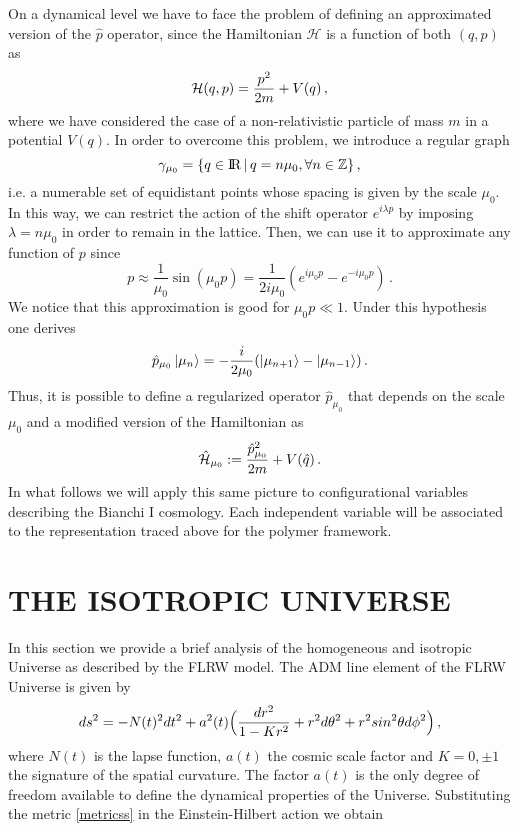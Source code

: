 \documentclass[aps,prd,twocolumn,nofootinbib,superscriptaddress]{revtex4-2}
\begin{document}
On a dynamical level we have to face the problem of defining an approximated version of the $\hat p$ operator, since the Hamiltonian $\mathcal{H}$ is a function of both $(q,p)$ as
\begin{equation}
	\mathcal{H}(q,p)={p^{2}\over 2m}+V(q)\,,
\end{equation}
where we have considered the case of a non-relativistic particle of mass $m$ in a potential $V(q)$.
In order to overcome this problem, we introduce a regular graph
\begin{equation}
	\gamma_{\mu_{0}}=\{q\in{\rm I\!R}\,|\, q=n\mu_{0}, \forall n \in \mathbb{Z}\}\,,
\end{equation}
i.e. a numerable set of equidistant points whose spacing is given by the scale $\mu_{0}$. In this way, we can restrict the action of the shift operator $e^{i\lambda p}$ by imposing $\lambda=n \mu_{0}$ in order to remain in the lattice. Then, we can use it to approximate any function of $p$ since
\begin{equation}
	\label{approxPol}
	p \approx \frac{1}{\mu_{0}} \sin \left(\mu_{0} p\right)=\frac{1}{2 i \mu_{0}}\left(e^{i \mu_{0} p}-e^{-i \mu_{0} p}\right)\,.
\end{equation}
We notice that this approximation is good for $\mu_{0}p\ll1$. Under this hypothesis one derives
\begin{equation}
	\label{phat}
	\hat{p}_{\mu_{0}}\ket{\mu_{n}}=-{i\over 2\mu_{0}}(\ket{\mu_{n+1}}-\ket{\mu_{n-1}})\,.
\end{equation}
Thus, it is possible to define a regularized operator $\hat p_{\mu_{0}}$ that depends on the scale $\mu_{0}$ and a modified version of the Hamiltonian as
\begin{equation}
	\hat{\mathcal{H}}_{\mu_{0}}:={\hat{p}^{2}_{\mu_{0}}\over 2m}+V(\hat q)\,.
\end{equation}
In what follows we will apply this same picture to configurational variables describing the Bianchi I cosmology. Each independent variable will be associated to the representation traced above for the polymer framework.
	
\section{THE ISOTROPIC UNIVERSE\label{iso}}

In this section we provide a brief analysis of the homogeneous and isotropic Universe as described by the FLRW model. The ADM line element of the FLRW Universe is given by
\begin{equation}
	\label{metricss} ds^{2}=-N(t)^{2}dt^{2}+a^{2}(t)\Big({dr^{2}\over 1-Kr^{2}}+ r^{2}d\theta^{2}+r^{2}sin^{2}\theta d\phi^{2}\Big)\,,
\end{equation}
where $N(t)$ is the lapse function, $a(t)$ the cosmic scale factor and $K=0,\pm1$ the signature of the spatial curvature. The factor $a(t)$ is the only degree of freedom available to define the dynamical properties of the Universe. Substituting the metric \eqref{metricss} in the Einstein-Hilbert action we obtain
		
\end{document}
